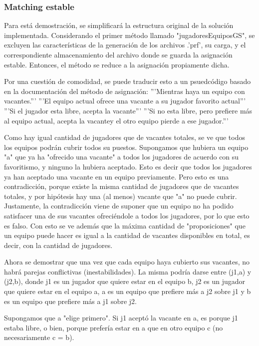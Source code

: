 \documentclass[article,a4paper]{article}
\begin{document}
\subsubsection{Matching estable}

Para está demostración, se simplificará la estructura original de la solución implementada. Considerando el primer método llamado "jugadoresEquiposGS", se excluyen las características de la generación de los archivos .'prf', su carga, y el correspondiente almacenamiento del archivo donde se guarda la asignación estable. Entonces, el método se reduce a la asignación propiamente dicha.

Por una cuestión de comodidad, se puede traducir esto a un psuedcódigo basado en la documentación del método de asignación:
'''Mientras haya un equipo con vacantes.'''
    '''El equipo actual ofrece una vacante a su jugador favorito actual'''
        '''Si el jugador esta libre, acepta la vacante'''
              '''Si no esta libre, pero prefiere más al equipo actual, acepta la vacantey el otro equipo pierde a ese jugador.'''

Como hay igual cantidad de jugadores que de vacantes totales, se ve que todos los equipos podrán cubrir todos su puestos. Supongamos que hubiera un equipo "a" que ya ha "ofrecido una vacante" a todos los jugadores de acuerdo con su favoritismo, y ninguno la hubiera aceptado. Esto es decir que todos los jugadores ya han aceptado una vacante en un equipo previamente. Pero esto es una contradicción, porque existe la misma cantidad de jugadores que de vacantes totales, y por hipótesis hay una (al menos) vacante que "a" no puede cubrir. Justamente, la contradicción viene de suponer que un equipo no ha podido satisfacer una de sus vacantes ofreciéndole a todos los jugadores, por lo que esto es falso. Con esto se ve además que la máxima cantidad de "proposiciones" que un equipo puede hacer es igual a la cantidad de vacantes disponibles en total, es decir, con la cantidad de jugadores.

Ahora se demostrar que una vez que cada equipo haya cubierto sus vacantes, no habrá parejas conflictivas (inestabilidades). La misma podría darse entre (j1,a) y (j2,b), donde j1 es un jugador que quiere estar en el equipo b, j2 es un jugador que quiere estar en el equipo a, a es un equipo que prefiere más a j2 sobre j1 y b es un equipo que prefiere más a j1 sobre j2.

Supongamos que a "elige primero". Si j1 aceptó la vacante en a, es porque j1 estaba libre, o bien, porque prefería estar en a que en otro equipo c (no necesariamente c = b).     
\end{document}
